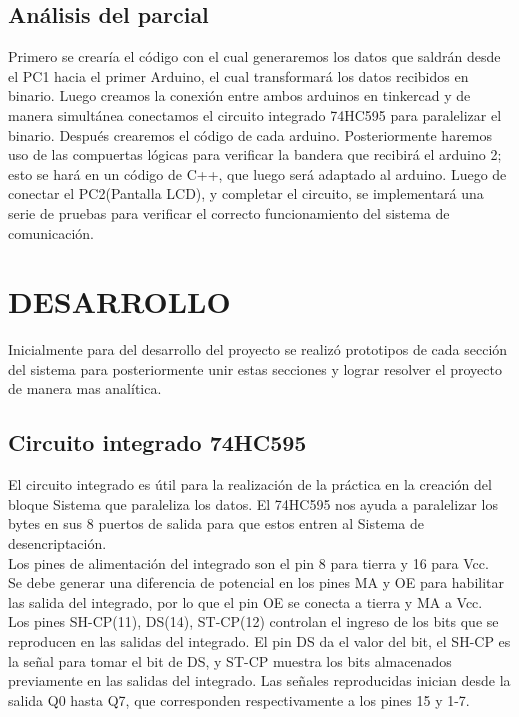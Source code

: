 \documentclass{article}
\begin{document}
\subsection{Análisis del parcial}
	
	Primero se crearía el código con el cual generaremos los datos que saldrán desde el PC1 hacia el primer Arduino, el cual transformará los datos recibidos en binario. 
Luego creamos la conexión entre ambos arduinos en tinkercad y de manera simultánea conectamos el circuito integrado 74HC595 para paralelizar el binario.
Después crearemos el código de cada arduino. 
Posteriormente haremos uso de las compuertas lógicas para verificar la bandera que recibirá el arduino 2; esto se hará en un código de C++, que luego será adaptado al arduino.
Luego de conectar el PC2(Pantalla LCD), y completar el circuito, se implementará una serie de pruebas para verificar el correcto funcionamiento del sistema de comunicación. 


\section{DESARROLLO}

Inicialmente para del desarrollo del proyecto se realizó prototipos de cada sección del sistema para posteriormente unir estas secciones y lograr resolver el proyecto de manera mas analítica.

\subsection{Circuito integrado 74HC595}
El circuito integrado es útil para la realización de la práctica en la creación del bloque Sistema que paraleliza los datos. El 74HC595 nos ayuda a paralelizar los bytes en sus 8 puertos de salida para que estos entren al Sistema de desencriptación.\\

Los pines de alimentación del integrado son el pin 8 para tierra y 16 para Vcc.\\

Se debe generar una diferencia de potencial en los pines MA y OE para habilitar las salida del integrado, por lo que el pin OE se conecta a tierra y MA a Vcc.\\

Los pines SH-CP(11), DS(14), ST-CP(12) controlan el ingreso de los bits que se reproducen en las salidas del integrado. El pin DS da el valor del bit, el SH-CP es la señal para tomar el bit de DS, y ST-CP muestra los bits almacenados previamente en las salidas del integrado. Las señales reproducidas inician desde la salida Q0 hasta Q7, que corresponden respectivamente a los pines 15 y 1-7. \cite{youtube}\\
\end{document}
